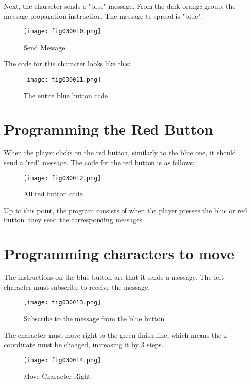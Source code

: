 Next, the character sends a "blue" message. From the dark orange group, the message propagation instruction. The message to spread is "blue".

\begin{figure}[H]
   \centering
   \texttt{[image: fig030010.png]}
   \caption{Send Message}
\label{fig030010}
\end{figure}

The code for this character looks like this:

\begin{figure}[H]
   \centering
   \texttt{[image: fig030011.png]}
   \caption{The entire blue button code}
\label{fig030011}
\end{figure}

\section{Programming the Red Button}

When the player clicks on the red button, similarly to the blue one, it should send a "red" message. The code for the red button is as follows:

\begin{figure}[H]
   \centering
   \texttt{[image: fig030012.png]}
   \caption{All red button code}
\label{fig030012}
\end{figure}

Up to this point, the program consists of when the player presses the blue or red button, they send the corresponding messages.

\section{Programming characters to move}
The instructions on the blue button are that it sends a message. The left character must subscribe to receive the message.

\begin{figure}[H]
   \centering
   \texttt{[image: fig030013.png]}
   \caption{Subscribe to the message from the blue button}
\label{fig030013}
\end{figure}

The character must move right to the green finish line, which means the x coordinate must be changed, increasing it by 3 steps.

\begin{figure}[H]
   \centering
   \texttt{[image: fig030014.png]}
   \caption{Move Character Right}
\label{fig030014}
\end{figure}

